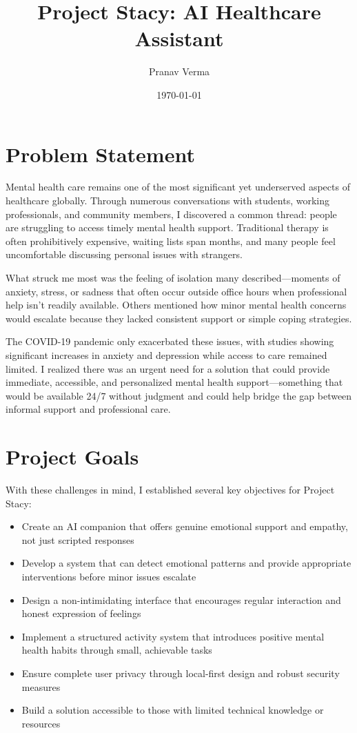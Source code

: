 \documentclass[12pt]{article}
\title{Project Stacy: AI Healthcare Assistant}
\author{Pranav Verma}
\date{\today}
\begin{document}
\maketitle
\tableofcontents
\newpage

\section{Problem Statement}

Mental health care remains one of the most significant yet underserved aspects of healthcare globally. Through numerous conversations with students, working professionals, and community members, I discovered a common thread: people are struggling to access timely mental health support. Traditional therapy is often prohibitively expensive, waiting lists span months, and many people feel uncomfortable discussing personal issues with strangers.

What struck me most was the feeling of isolation many described—moments of anxiety, stress, or sadness that often occur outside office hours when professional help isn't readily available. Others mentioned how minor mental health concerns would escalate because they lacked consistent support or simple coping strategies.

The COVID-19 pandemic only exacerbated these issues, with studies showing significant increases in anxiety and depression while access to care remained limited. I realized there was an urgent need for a solution that could provide immediate, accessible, and personalized mental health support—something that would be available 24/7 without judgment and could help bridge the gap between informal support and professional care.

\section{Project Goals}

With these challenges in mind, I established several key objectives for Project Stacy:

\begin{itemize}
    \item Create an AI companion that offers genuine emotional support and empathy, not just scripted responses
    \item Develop a system that can detect emotional patterns and provide appropriate interventions before minor issues escalate
    \item Design a non-intimidating interface that encourages regular interaction and honest expression of feelings
    \item Implement a structured activity system that introduces positive mental health habits through small, achievable tasks
    \item Ensure complete user privacy through local-first design and robust security measures
    \item Build a solution accessible to those with limited technical knowledge or resources
\end{itemize}
\end{document}
